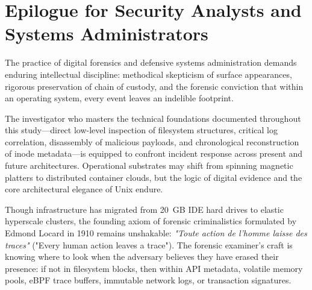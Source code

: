 \section{Epilogue for Security Analysts and Systems Administrators}

The practice of digital forensics and defensive systems administration demands enduring intellectual discipline: methodical skepticism of surface appearances, rigorous preservation of chain of custody, and the forensic conviction that within an operating system, every event leaves an indelible footprint.

The investigator who masters the technical foundations documented throughout this study---direct low-level inspection of filesystem structures, critical log correlation, disassembly of malicious payloads, and chronological reconstruction of inode metadata---is equipped to confront incident response across present and future architectures. Operational substrates may shift from spinning magnetic platters to distributed container clouds, but the logic of digital evidence and the core architectural elegance of Unix endure.

\begin{notaforense}
Though infrastructure has migrated from 20~GB IDE hard drives to elastic hyperscale clusters, the founding axiom of forensic criminalistics formulated by Edmond Locard in 1910 remains unshakable: \textit{"Toute action de l'homme laisse des traces"} ("Every human action leaves a trace"). The forensic examiner's craft is knowing where to look when the adversary believes they have erased their presence: if not in filesystem blocks, then within API metadata, volatile memory pools, eBPF trace buffers, immutable network logs, or transaction signatures.
\end{notaforense}
